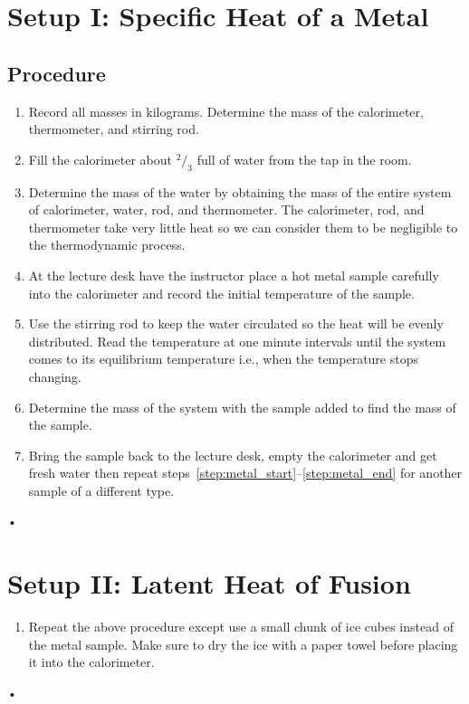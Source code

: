 \documentclass[main.tex]{subfiles}
\begin{document}
\section{Setup I: Specific Heat of a Metal}

\subsection*{Procedure}
\begin{enumerate}
\item \label{step:metal_start}
Record all masses in kilograms. Determine the mass of the calorimeter, thermometer, and stirring rod.
\item
Fill the calorimeter about $^2\!/_3$ full of water from the tap in the room.
\item
Determine the mass of the water by obtaining the mass of the entire system of calorimeter, water, rod, and thermometer. The calorimeter, rod, and thermometer take very little heat so we can consider them to be negligible to the thermodynamic process.
\item
At the lecture desk have the instructor place a hot metal sample carefully into the calorimeter and record the initial temperature of the sample.
\item
Use the stirring rod to keep the water circulated so the heat will be evenly distributed. Read the temperature at one minute intervals until the system comes to its equilibrium temperature i.e., when the temperature stops changing.
\item \label{step:metal_end}
Determine the mass of the system with the sample added to find the mass of the sample.
\item
Bring the sample back to the lecture desk, empty the calorimeter and get fresh water then repeat steps~\ref{step:metal_start}--\ref{step:metal_end} for another sample of a different type.
\end{enumerate}•

\section{Setup II: Latent Heat of Fusion}
\begin{enumerate}
\item
Repeat the above procedure except use a small chunk of ice cubes instead of the metal sample. Make sure to dry the ice with a paper towel before placing it into the calorimeter.
\end{enumerate}•
\end{document}
